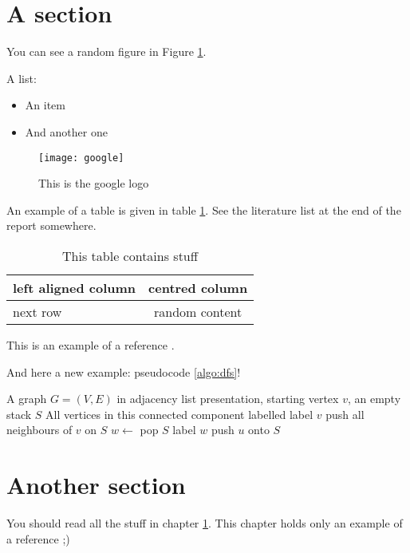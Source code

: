 \section{A section}
\label{sec:exampleA}

You can see a random figure in Figure \ref{fig:googlelogo}.

A list:
\begin{itemize}
\item An item
\item And another one
\end{itemize}

\begin{figure}[h]
\center
\texttt{[image: google]}
\caption{This is the google logo}
\label{fig:googlelogo}
\end{figure}


An example of a table is given in table \ref{tab:randomtable}. See the literature list at the end of the report somewhere.

\begin{table}[h]
\center
\begin{tabular}{|l|c|}\hline
left aligned column & centred column \\\hline
next row  & random content\\\hline
\end{tabular}
\caption{This table contains stuff}
\label{tab:randomtable}
\end{table}

This is an example of a reference \cite{becker}.

And here a new example: pseudocode \ref{algo:dfs}!
\begin{algorithm}
\caption{}
\label{algo:dfs}
\begin{algorithmic}[1]
\REQUIRE A graph $G=(V,E)$ in adjacency list presentation, starting vertex $v$, an empty stack $S$
\ENSURE All vertices in this connected component labelled
\STATE label $v$
\STATE push all neighbours of $v$ on $S$
	\STATE $w \leftarrow$ pop $S$
	\STATE label $w$
			\STATE push $u$ onto $S$
		\ENDIF
	\ENDFOR
\ENDWHILE
\end{algorithmic}
\end{algorithm}


\section{Another section}
You should read all the stuff in chapter \ref{sec:exampleA}. This chapter holds only an example of a reference ;)

